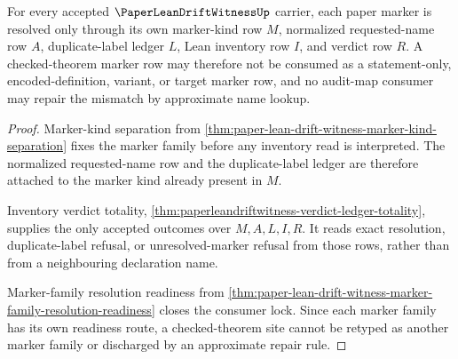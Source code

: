 \begin{theorem}
\label{thm:paper-lean-drift-witness-marker-inventory-kind-lock}
For every accepted $\PaperLeanDriftWitnessUp$ carrier, each paper marker is resolved only through its own marker-kind row $M$, normalized requested-name row $A$, duplicate-label ledger $L$, Lean inventory row $I$, and verdict row $R$. A checked-theorem marker row may therefore not be consumed as a statement-only, encoded-definition, variant, or target marker row, and no audit-map consumer may repair the mismatch by approximate name lookup.
\end{theorem}
\begin{proof}
Marker-kind separation from \autoref{thm:paper-lean-drift-witness-marker-kind-separation} fixes the marker family before any inventory read is interpreted. The normalized requested-name row and the duplicate-label ledger are therefore attached to the marker kind already present in $M$.

Inventory verdict totality, \autoref{thm:paperleandriftwitness-verdict-ledger-totality}, supplies the only accepted outcomes over $M,A,L,I,R$. It reads exact resolution, duplicate-label refusal, or unresolved-marker refusal from those rows, rather than from a neighbouring declaration name.

Marker-family resolution readiness from \autoref{thm:paper-lean-drift-witness-marker-family-resolution-readiness} closes the consumer lock. Since each marker family has its own readiness route, a checked-theorem site cannot be retyped as another marker family or discharged by an approximate repair rule.
\end{proof}


